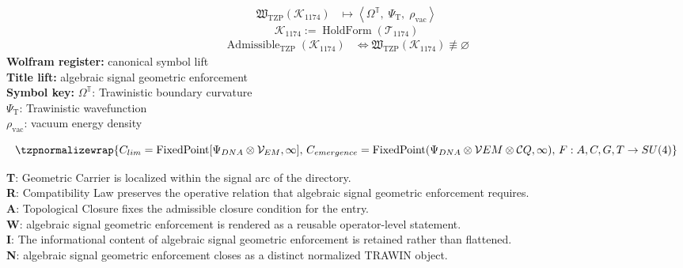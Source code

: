 \noindent
\begin{minipage}[t]{0.48\linewidth}
\begingroup
\small
\[
\begin{aligned}
\mathfrak{W}_{\mathrm{TZP}}\!\left(\mathcal{K}_{1174}\right)
&\longmapsto
\left\langle \Omega^{\mathbb{T}},\; \Psi_{\mathrm{T}},\; \rho_{\mathrm{vac}} \right\rangle
\end{aligned}
\]
\[
\mathcal{K}_{1174}
:=
\operatorname{HoldForm}\!\left(\mathcal{T}_{1174}\right)
\]
\[
\begin{aligned}
\operatorname{Admissible}_{\mathrm{TZP}}\!\left(\mathcal{K}_{1174}\right)
&\Longleftrightarrow
\mathfrak{W}_{\mathrm{TZP}}\!\left(\mathcal{K}_{1174}\right)\not\equiv\varnothing
\end{aligned}
\]
\textbf{Wolfram register:} canonical symbol lift\\
\textbf{Title lift:} algebraic signal geometric enforcement\\
\textbf{Symbol key:} \(\Omega^{\mathbb{T}}\): Trawinistic boundary curvature\\ \(\Psi_{\mathrm{T}}\): Trawinistic wavefunction\\ \(\rho_{\mathrm{vac}}\): vacuum energy density
\par
\endgroup
\end{minipage}\hfill
\begin{minipage}[t]{0.48\linewidth}
\[
\tzpnormalizewrap{C_{lim} = \text{FixedPoint}[\Psi_{DNA} \otimes \mathcal{V}_{EM}, \infty],\,C_{emergence} = \text{FixedPoint}(\Psi_{DNA} \otimes \mathcal{V} {EM} \otimes \mathcal{C} {Q}, \infty),\,F: {A, C, G, T} \rightarrow SU(4)}
\]

\small
\textbf{T}: Geometric Carrier is localized within the signal arc of the directory.\\
\textbf{R}: Compatibility Law preserves the operative relation that algebraic signal geometric enforcement requires.\\
\textbf{A}: Topological Closure fixes the admissible closure condition for the entry.\\
\textbf{W}: algebraic signal geometric enforcement is rendered as a reusable operator-level statement.\\
\textbf{I}: The informational content of algebraic signal geometric enforcement is retained rather than flattened.\\
\textbf{N}: algebraic signal geometric enforcement closes as a distinct normalized TRAWIN object.
\normalsize
\end{minipage}

